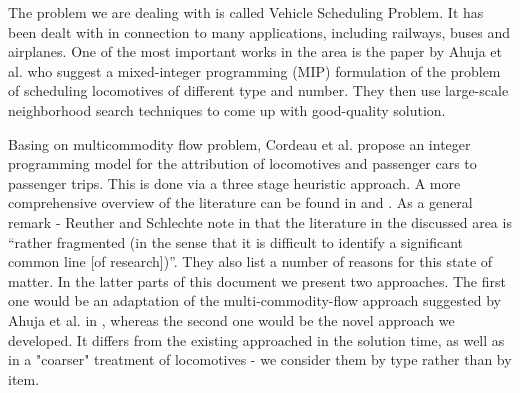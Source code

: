 The problem we are dealing with is called Vehicle Scheduling Problem. It has been dealt with in connection to many applications, including railways, buses and airplanes. 
One of the most important works in the area is the paper by Ahuja et al. \cite{ahuja_solving_2005} who suggest a mixed-integer programming (MIP) formulation of the problem of scheduling locomotives of different type and number. They then use large-scale neighborhood search techniques to come up with good-quality solution. 

Basing on multicommodity flow problem, Cordeau et al. \cite{cordeau_simultaneous_2001} propose an integer programming model for the attribution of locomotives and passenger cars to passenger trips. This is done via a three stage heuristic approach. 
\newline
A more comprehensive overview of the literature can be found in \cite{reuther_schlechte_2018} and \cite{lobel_optimal_1997}. As a general remark - Reuther and Schlechte note in \cite{reuther_schlechte_2018} that the literature in the discussed area is “rather fragmented (in the sense that it is difficult to identify a significant common line [of research])”. They also list a number of reasons for this state of matter.
\newline 
In the latter parts of this document we present two approaches. The first one would be an adaptation of the multi-commodity-flow approach suggested by Ahuja et al. in \cite{ahuja_solving_2005}, whereas the second one would be the novel approach we developed. It differs from the existing approached in the solution time, as well as in a "coarser" treatment of locomotives - we consider them by type rather than by item.

